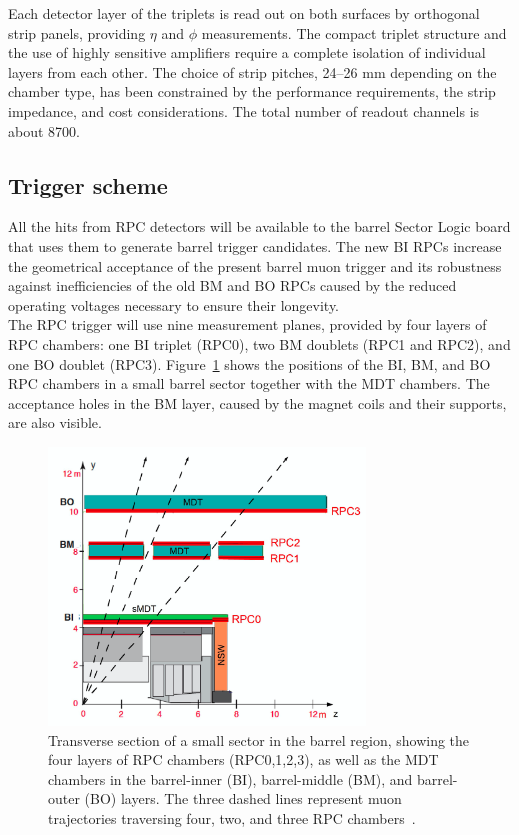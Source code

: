 Each detector layer of the triplets is read out on both surfaces by orthogonal strip panels,
providing $\eta$ and $\phi$ measurements. The compact triplet structure and the use of highly
sensitive amplifiers require a complete isolation of individual layers from each other. The
choice of strip pitches, 24–26 mm depending on the chamber type, has been constrained
by the performance requirements, the strip impedance, and cost considerations. The total
number of readout channels is about 8700.

\subsection {Trigger scheme}
\label{sec:trigScheme}
All the hits from RPC detectors will be available to the barrel Sector Logic board that uses them to
generate barrel trigger candidates. The new BI RPCs increase the geometrical acceptance
of the present barrel muon trigger and its robustness against inefficiencies of the old BM
and BO RPCs caused by the reduced operating voltages necessary to ensure their longevity.\\
The RPC trigger will use nine measurement planes, provided by four layers of RPC chambers:
one BI triplet (RPC0), two BM doublets (RPC1 and RPC2), and one BO doublet (RPC3).
Figure~\ref{fig:trig_schemeXY} shows the positions of the BI, BM, and BO RPC chambers in a small 
barrel sector
together with the MDT chambers. The acceptance holes in the BM layer, caused by the
magnet coils and their supports, are also visible.
\begin{figure}[!h]
	\centering
	\includegraphics[width=0.75\textwidth]{Chapters/CH3/figures/trig_schemeXY_paint}
	\caption{Transverse section of a small sector in the barrel region, showing the four layers of RPC chambers (RPC0,1,2,3), as well as the MDT chambers in the barrel-inner (BI), barrel-middle (BM), and barrel-outer (BO) layers. The three dashed lines represent muon trajectories traversing four, two, and three RPC chambers~\cite{TDR}.}
	\label{fig:trig_schemeXY}
\end{figure}
